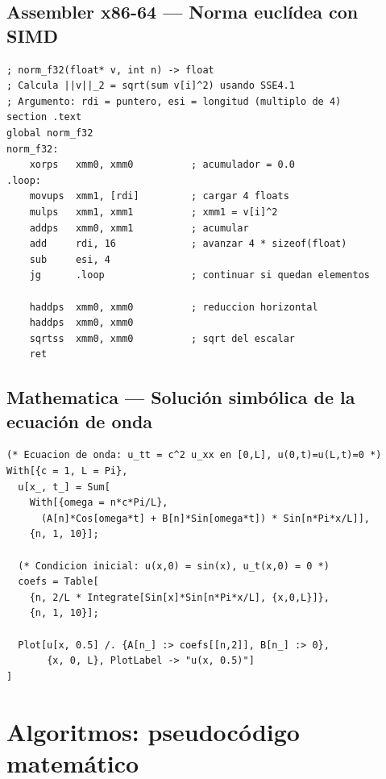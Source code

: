 \subsection{Assembler x86-64 — Norma euclídea con SIMD}
\label{subsec:asm}

\begin{lstlisting}[style=asm,
  caption={Norma euclídea de un vector float con instrucciones SSE4},
  label={lst:norm-asm}]
; norm_f32(float* v, int n) -> float
; Calcula ||v||_2 = sqrt(sum v[i]^2) usando SSE4.1
; Argumento: rdi = puntero, esi = longitud (multiplo de 4)
section .text
global norm_f32
norm_f32:
    xorps   xmm0, xmm0          ; acumulador = 0.0
.loop:
    movups  xmm1, [rdi]         ; cargar 4 floats
    mulps   xmm1, xmm1          ; xmm1 = v[i]^2
    addps   xmm0, xmm1          ; acumular
    add     rdi, 16             ; avanzar 4 * sizeof(float)
    sub     esi, 4
    jg      .loop               ; continuar si quedan elementos

    haddps  xmm0, xmm0          ; reduccion horizontal
    haddps  xmm0, xmm0
    sqrtss  xmm0, xmm0          ; sqrt del escalar
    ret
\end{lstlisting}

\subsection{Mathematica — Solución simbólica de la ecuación de onda}
\label{subsec:mathematica}

\begin{lstlisting}[style=mathematica,
  caption={Solución simbólica de la ecuación de onda 1D con condiciones de Dirichlet},
  label={lst:wave-mathematica}]
(* Ecuacion de onda: u_tt = c^2 u_xx en [0,L], u(0,t)=u(L,t)=0 *)
With[{c = 1, L = Pi},
  u[x_, t_] = Sum[
    With[{omega = n*c*Pi/L},
      (A[n]*Cos[omega*t] + B[n]*Sin[omega*t]) * Sin[n*Pi*x/L]],
    {n, 1, 10}];

  (* Condicion inicial: u(x,0) = sin(x), u_t(x,0) = 0 *)
  coefs = Table[
    {n, 2/L * Integrate[Sin[x]*Sin[n*Pi*x/L], {x,0,L}]},
    {n, 1, 10}];

  Plot[u[x, 0.5] /. {A[n_] :> coefs[[n,2]], B[n_] :> 0},
       {x, 0, L}, PlotLabel -> "u(x, 0.5)"]
]
\end{lstlisting}

\section{Algoritmos: pseudocódigo matemático}
\label{sec:algoritmos}

